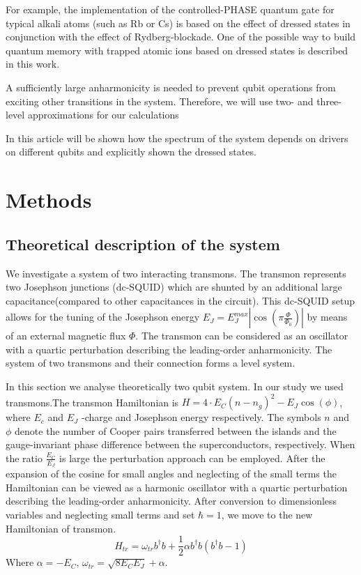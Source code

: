 \documentclass[%
 aip,
 amsmath,amssymb,
 reprint,%
]{revtex4-1}
\begin{document}
For example, the implementation of the controlled-PHASE quantum gate for typical alkali atoms (such as Rb or Cs)  is based on the effect of dressed states in conjunction with the effect of Rydberg-blockade\cite{sun2018analysis}. One of the possible way to build quantum memory with trapped atomic ions based on dressed states is described in this work\cite{timoney2011quantum}. 

A sufficiently large anharmonicity is needed to prevent qubit operations from exciting other transitions in the system. Therefore, we will use two- and three-level approximations for our calculations


In this article will be shown how the spectrum of the system depends on drivers on different qubits and explicitly shown the dressed states.%
 
\section{Methods}
\subsection{Theoretical description of the system}

We investigate a system of two interacting transmons. The transmon represents two Josephson junctions (dc-SQUID) which are shunted by an additional large capacitance(compared to other capacitances in the circuit). This dc-SQUID setup allows for the tuning of the Josephson energy $E_J = E_J^{max}|\cos(\pi \frac{\Phi}{\Phi_0})|$  by
means of an external magnetic flux $\Phi$. The transmon can be considered as an oscillator with a quartic perturbation describing the leading-order anharmonicity. The system of two transmons and their connection forms a level system.

In this section we analyse theoretically two qubit system.
 In our study we used transmons.The transmon Hamiltonian is $H = 4\cdot E_C(n-n_g)^2 -E_J\cos(\phi)$, where $E_c $ and $E_J$ -charge and Josephson energy respectively. The symbols $n$ and $\phi$ denote the number of Cooper pairs transferred between the islands and the
 gauge-invariant phase difference between the superconductors,
 respectively.
 When the ratio $\frac{E_C}{E_J}$ is large the perturbation approach can
 be employed. After the expansion of the cosine for small angles and neglecting of the small terms the Hamiltonian can be
 viewed as a harmonic oscillator with a quartic perturbation describing the leading-order anharmonicity.
 After conversion to dimensionless variables and neglecting small terms and set $\hbar = 1$, we move to the new Hamiltonian of transmon. 
\begin{equation}
H_{tr}= \omega_{tr} b^{\dagger}b +\frac{1}{2}\alpha b^{\dagger}b(b^{\dagger}b-1)
\end{equation}
Where $\alpha=-E_C$, $\omega_{tr}=\sqrt{8E_CE_J}+\alpha$.
\end{document}
